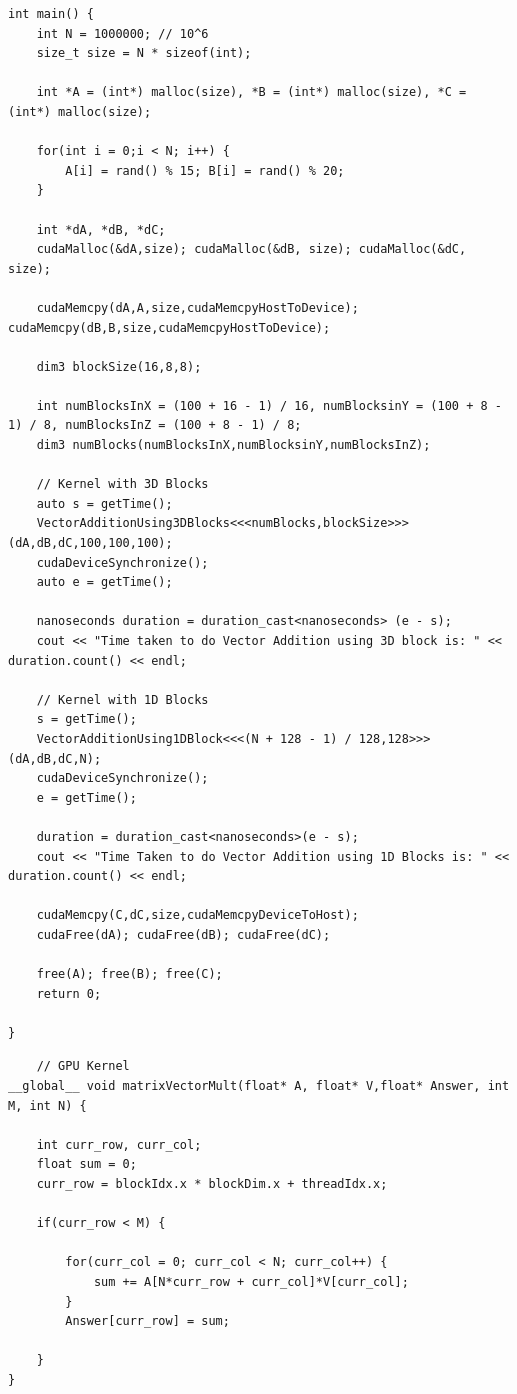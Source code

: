 \documentclass{article}
\begin{document}
\begin{lstlisting}
int main() {
    int N = 1000000; // 10^6
    size_t size = N * sizeof(int);

    int *A = (int*) malloc(size), *B = (int*) malloc(size), *C = (int*) malloc(size);

    for(int i = 0;i < N; i++) {
        A[i] = rand() % 15; B[i] = rand() % 20;
    }

    int *dA, *dB, *dC;
    cudaMalloc(&dA,size); cudaMalloc(&dB, size); cudaMalloc(&dC, size);

    cudaMemcpy(dA,A,size,cudaMemcpyHostToDevice); cudaMemcpy(dB,B,size,cudaMemcpyHostToDevice);

    dim3 blockSize(16,8,8);

    int numBlocksInX = (100 + 16 - 1) / 16, numBlocksinY = (100 + 8 - 1) / 8, numBlocksInZ = (100 + 8 - 1) / 8;
    dim3 numBlocks(numBlocksInX,numBlocksinY,numBlocksInZ);

    // Kernel with 3D Blocks
    auto s = getTime();
    VectorAdditionUsing3DBlocks<<<numBlocks,blockSize>>> (dA,dB,dC,100,100,100);
    cudaDeviceSynchronize();
    auto e = getTime();

    nanoseconds duration = duration_cast<nanoseconds> (e - s);
    cout << "Time taken to do Vector Addition using 3D block is: " << duration.count() << endl;

    // Kernel with 1D Blocks
    s = getTime();
    VectorAdditionUsing1DBlock<<<(N + 128 - 1) / 128,128>>>(dA,dB,dC,N);
    cudaDeviceSynchronize();
    e = getTime();

    duration = duration_cast<nanoseconds>(e - s);
    cout << "Time Taken to do Vector Addition using 1D Blocks is: " << duration.count() << endl;

    cudaMemcpy(C,dC,size,cudaMemcpyDeviceToHost);
    cudaFree(dA); cudaFree(dB); cudaFree(dC);

    free(A); free(B); free(C);
    return 0;
    
}
\end{lstlisting}


\begin{lstlisting}
    // GPU Kernel
__global__ void matrixVectorMult(float* A, float* V,float* Answer, int M, int N) {
    
    int curr_row, curr_col;
    float sum = 0;
    curr_row = blockIdx.x * blockDim.x + threadIdx.x;

    if(curr_row < M) {

        for(curr_col = 0; curr_col < N; curr_col++) {
            sum += A[N*curr_row + curr_col]*V[curr_col];
        }
        Answer[curr_row] = sum;

    }
}

\end{lstlisting}
\end{document}
